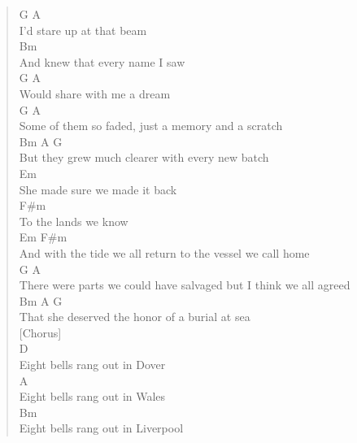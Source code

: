 \documentclass[11pt]{article}
\begin{document}
\begin{verse}
\hspace*{5em}G                A\\
I'd stare up at that beam\\
\hspace*{5em}Bm\\
And knew that every name I saw\\
\hspace*{7em}G               A\\
Would share with me a dream\\
\hspace*{1em}G                              A\\
Some of them so faded, just a memory and a scratch\\
\hspace*{5em}Bm              A           G\\
But they grew much clearer with every new batch\\
\vspace*{1em}
Em\\
She made sure we made it back\\
F\#m\\
To the lands we know\\
\hspace*{5em}Em                                 F\#m\\
And with the tide we all return to the vessel we call home\\
\hspace*{12em}G                                   A\\
There were parts we could have salvaged but I think we all agreed\\
\hspace*{5em}Bm                A           G\\
That she deserved the honor of a burial at sea\\
\vspace*{1em}
\vspace*{1em}
[Chorus]\\
\vspace*{1em}
\hspace*{7em}D\\
Eight bells rang out in Dover\\
\hspace*{7em}A\\
Eight bells rang out in Wales\\
\hspace*{7em}Bm\\
Eight bells rang out in Liverpool\\

\end{verse}
\end{document}
